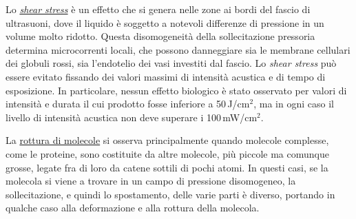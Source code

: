\documentclass{report}
\numberwithin{equation}{section}
\numberwithin{figure}{section}
\begin{document}
Lo \underline{\textit{shear stress}} è un effetto che si genera nelle zone ai bordi del fascio di ultrasuoni, dove il liquido è soggetto a notevoli differenze di pressione in un volume molto ridotto. Questa disomogeneità della sollecitazione pressoria determina microcorrenti locali, che possono danneggiare sia le membrane cellulari dei globuli rossi, sia l’endotelio dei vasi investiti dal fascio. Lo \textit{shear stress} può essere evitato fissando dei valori massimi di intensità acustica e di tempo di esposizione. In particolare, nessun effetto biologico è stato osservato per valori di intensità e durata il cui prodotto fosse inferiore a 50\,J/$\text{cm}^2$, ma in ogni caso il livello di intensità acustica non deve superare i 100\,mW/$\text{cm}^2$.

La \underline{rottura di molecole} si osserva principalmente quando molecole complesse, come le proteine, sono costituite da altre molecole, più piccole ma comunque grosse, legate fra di loro da catene sottili di pochi atomi. In questi casi, se la molecola si viene a trovare in un campo di pressione disomogeneo, la sollecitazione, e quindi lo spostamento, delle varie parti è diverso, portando in qualche caso alla deformazione e alla rottura della molecola.
\end{document}
